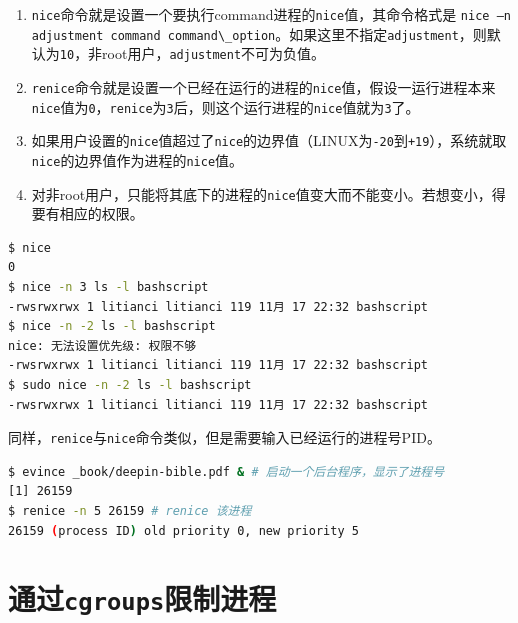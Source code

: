 \documentclass[doctor,openright,twoside]{sjtuthesis}
\providecommand{\tightlist}{%
    \setlength{\itemsep}{0pt}\setlength{\parskip}{0pt}}
\newcommand{\passthrough}[1]{#1}
\theoremstyle{plain}
\theoremstyle{definition}
\theoremstyle{remark}
\theoremstyle{ocrenumbox}
\theoremstyle{plain}
\begin{document}
\begin{enumerate}
\def\labelenumi{\arabic{enumi}.}
\tightlist
\item
  \passthrough{\lstinline!nice!}命令就是设置一个要执行command进程的\passthrough{\lstinline!nice!}值，其命令格式是
  \passthrough{\lstinline!nice –n adjustment command command\_option!}。如果这里不指定\passthrough{\lstinline!adjustment!}，则默认为\passthrough{\lstinline!10!}，非root用户，\passthrough{\lstinline!adjustment!}不可为负值。
\item
  \passthrough{\lstinline!renice!}命令就是设置一个已经在运行的进程的\passthrough{\lstinline!nice!}值，假设一运行进程本来\passthrough{\lstinline!nice!}值为\passthrough{\lstinline!0!}，\passthrough{\lstinline!renice!}为\passthrough{\lstinline!3!}后，则这个运行进程的\passthrough{\lstinline!nice!}值就为\passthrough{\lstinline!3!}了。
\item
  如果用户设置的\passthrough{\lstinline!nice!}值超过了\passthrough{\lstinline!nice!}的边界值（LINUX为\passthrough{\lstinline!-20!}到\passthrough{\lstinline!+19!}），系统就取\passthrough{\lstinline!nice!}的边界值作为进程的\passthrough{\lstinline!nice!}值。
\item
  对非root用户，只能将其底下的进程的\passthrough{\lstinline!nice!}值变大而不能变小。若想变小，得要有相应的权限。
\end{enumerate}

\begin{lstlisting}[language=bash]
$ nice
0
$ nice -n 3 ls -l bashscript
-rwsrwxrwx 1 litianci litianci 119 11月 17 22:32 bashscript
$ nice -n -2 ls -l bashscript
nice: 无法设置优先级: 权限不够
-rwsrwxrwx 1 litianci litianci 119 11月 17 22:32 bashscript
$ sudo nice -n -2 ls -l bashscript
-rwsrwxrwx 1 litianci litianci 119 11月 17 22:32 bashscript
\end{lstlisting}

同样，\passthrough{\lstinline!renice!}与\passthrough{\lstinline!nice!}命令类似，但是需要输入已经运行的进程号PID。

\begin{lstlisting}[language=bash]
$ evince _book/deepin-bible.pdf & # 启动一个后台程序，显示了进程号
[1] 26159
$ renice -n 5 26159 # renice 该进程
26159 (process ID) old priority 0, new priority 5
\end{lstlisting}

\hypertarget{cgroups}{%
\section{\texorpdfstring{通过\texttt{cgroups}限制进程}{通过cgroups限制进程}}\label{cgroups}}
\end{document}
